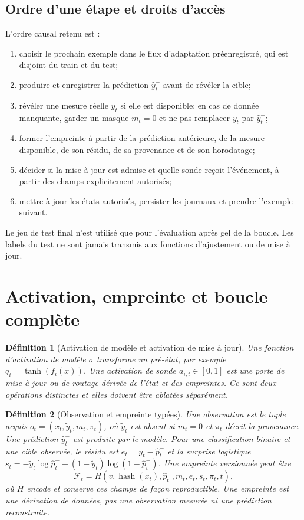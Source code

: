\documentclass[11pt,a4paper]{article}
\newtheorem{definition}{Définition}[section]
\begin{document}
\subsection{Ordre d'une étape et droits d'accès}
L'ordre causal retenu est :
\begin{enumerate}
\item choisir le prochain exemple dans le flux d'adaptation préenregistré, qui est disjoint du train et du test;
\item produire et enregistrer la prédiction $\hat y_t^-$ avant de révéler la cible;
\item révéler une mesure réelle $y_t$ si elle est disponible; en cas de donnée manquante, garder un masque $m_t=0$ et ne pas remplacer $y_t$ par $\hat y_t^-$;
\item former l'empreinte à partir de la prédiction antérieure, de la mesure disponible, de son résidu, de sa provenance et de son horodatage;
\item décider si la mise à jour est admise et quelle sonde reçoit l'événement, à partir des champs explicitement autorisés;
\item mettre à jour les états autorisés, persister les journaux et prendre l'exemple suivant.
\end{enumerate}
Le jeu de test final n'est utilisé que pour l'évaluation après gel de la boucle. Les labels du test ne sont jamais transmis aux fonctions d'ajustement ou de mise à jour.

\section{Activation, empreinte et boucle complète}
\begin{definition}[Activation de modèle et activation de mise à jour]
Une \emph{fonction d'activation de modèle} $\sigma$ transforme un pré-état, par exemple $q_i=\tanh(f_i(x))$. Une \emph{activation de sonde} $a_{i,t}\in[0,1]$ est une porte de mise à jour ou de routage dérivée de l'état et des empreintes. Ce sont deux opérations distinctes et elles doivent être ablatées séparément.
\end{definition}
\begin{definition}[Observation et empreinte typées]
Une observation est le tuple acquis $o_t=(x_t,\tilde y_t,m_t,\pi_t)$, où $\tilde y_t$ est absent si $m_t=0$ et $\pi_t$ décrit la provenance. Une prédiction $\hat y_t^-$ est produite par le modèle. Pour une classification binaire et une cible observée, le résidu est $e_t=\tilde y_t-\hat p_t^-$ et la surprise logistique $s_t=-\tilde y_t\log\hat p_t^--(1-\tilde y_t)\log(1-\hat p_t^-)$. Une empreinte versionnée peut être
\[
\mathcal F_t=H(v,\operatorname{hash}(x_t),\hat p_t^-,m_t,e_t,s_t,\pi_t,t),
\]
où $H$ encode et conserve ces champs de façon reproductible. Une empreinte est une dérivation de données, pas une observation mesurée ni une prédiction reconstruite.
\end{definition}
\end{document}
